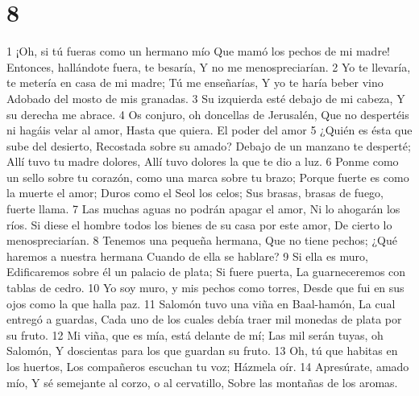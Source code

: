 \chapter{8}

1 ¡Oh, si tú fueras como un hermano mío
Que mamó los pechos de mi madre!
Entonces, hallándote fuera, te besaría,
Y no me menospreciarían.
2 Yo te llevaría, te metería en casa de mi madre;
Tú me enseñarías,
Y yo te haría beber vino
Adobado del mosto de mis granadas.
3 Su izquierda esté debajo de mi cabeza,
Y su derecha me abrace.
4 Os conjuro, oh doncellas de Jerusalén,
Que no despertéis ni hagáis velar al amor,
Hasta que quiera.
El poder del amor
5 ¿Quién es ésta que sube del desierto,
Recostada sobre su amado?
Debajo de un manzano te desperté;
Allí tuvo tu madre dolores,
Allí tuvo dolores la que te dio a luz.
6 Ponme como un sello sobre tu corazón, como una marca sobre tu brazo;
Porque fuerte es como la muerte el amor;
Duros como el Seol los celos;
Sus brasas, brasas de fuego, fuerte llama.
7 Las muchas aguas no podrán apagar el amor,
Ni lo ahogarán los ríos.
Si diese el hombre todos los bienes de su casa por este amor,
De cierto lo menospreciarían.
8 Tenemos una pequeña hermana,
Que no tiene pechos;
¿Qué haremos a nuestra hermana
Cuando de ella se hablare?
9 Si ella es muro,
Edificaremos sobre él un palacio de plata;
Si fuere puerta,
La guarneceremos con tablas de cedro.
10 Yo soy muro, y mis pechos como torres,
Desde que fui en sus ojos como la que halla paz.
11 Salomón tuvo una viña en Baal-hamón,
La cual entregó a guardas,
Cada uno de los cuales debía traer mil monedas de plata por su fruto.
12 Mi viña, que es mía, está delante de mí;
Las mil serán tuyas, oh Salomón,
Y doscientas para los que guardan su fruto.
13 Oh, tú que habitas en los huertos,
Los compañeros escuchan tu voz;
Házmela oír.
14 Apresúrate, amado mío,
Y sé semejante al corzo, o al cervatillo,
Sobre las montañas de los aromas.

